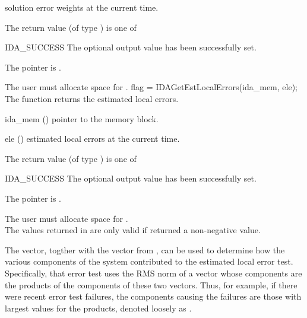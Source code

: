 {{\begin{args}[eweight]
    solution error weights at the current time.
  \end{args}
}
{
  The return value  (of type ) is one of
  \begin{args}
  \item[IDA\_SUCCESS]
    The optional output value has been successfully set.
  \item[\Id{IDA\_MEM\_NULL}]
    The  pointer is .
  \end{args}
}
{
  {\warn}The user must allocate space for .
}
{
  flag = IDAGetEstLocalErrors(ida\_mem, ele);
}
{
  The function  returns the estimated local errors.
}
{
  \begin{args}
  \item[ida\_mem] ()
    pointer to the {\ida} memory block.
  \item[ele] ()
    estimated local errors at the current time.
  \end{args}
}
{
  The return value  (of type ) is one of
  \begin{args}
  \item[IDA\_SUCCESS]
    The optional output value has been successfully set.
  \item[\Id{IDA\_MEM\_NULL}]
    The  pointer is .
  \end{args}
}
{
  {\warn}The user must allocate space for . \\
  The values returned in  are only valid if
   returned a non-negative value.

  The  vector, togther with the  vector from
  , can be used to determine how the various
  components of the system contributed to the estimated local error
  test.  Specifically, that error test uses the RMS norm of a vector
  whose components are the products of the components of these two vectors.
  Thus, for example, if there were recent error test failures, the components
  causing the failures are those with largest values for the products,
  denoted loosely as .

}}
